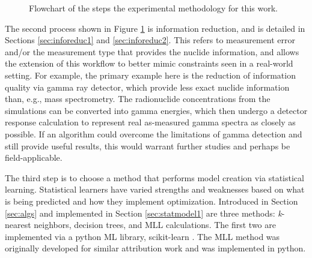 \begin{figure}[!hbt]
  \caption{Flowchart of the steps the experimental methodology for this work.}
  \label{fig:intromethod}
\end{figure}

The second process shown in Figure \ref{fig:intromethod} is information
reduction, and is detailed in Sections \ref{sec:inforeduc1} and
\ref{sec:inforeduc2}.  This refers to measurement error and/or the measurement
type that provides the nuclide information, and allows the extension of this
workflow to better mimic constraints seen in a real-world setting.  For
example, the primary example here is the reduction of information quality via
gamma ray detector, which provide less exact nuclide information than, e.g.,
mass spectrometry.  The radionuclide concentrations from the simulations can be
converted into gamma energies, which then undergo a detector response
calculation to represent real as-measured gamma spectra as closely as possible.
If an algorithm could overcome the limitations of gamma detection and still
provide useful results, this would warrant further studies and perhaps be
field-applicable.

The third step is to choose a method that performs model creation via
statistical learning.  Statistical learners have varied strengths and
weaknesses based on what is being predicted and how they implement
optimization. Introduced in Section \ref{sec:algs} and implemented in Section
\ref{sec:statmodel1} are three methods: \textit{k}-nearest neighbors, decision
trees, and \gls{MLL} calculations. The first two are implemented via a python
\gls{ML} library, scikit-learn \cite{scikit}. The \gls{MLL} method was
originally developed for similar attribution work \cite{mll_method,
mll_sensitivity, mll_validate} and was implemented in python.

